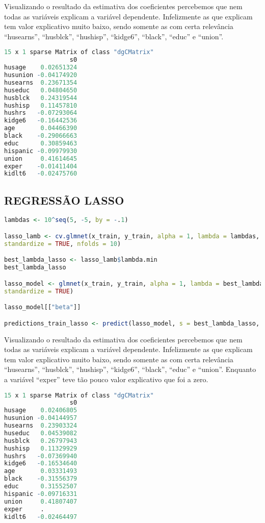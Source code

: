 Visualizando o resultado da estimativa dos coeficientes percebemos que nem todas as variáveis explicam a variável dependente. Infelizmente as que explicam tem valor explicativo muito baixo, sendo somente as com certa relevância ``husearns'', ``husblck'', ``hushisp'', ``kidge6'', ``black'', ``educ'' e ``union''. \\

\begin{lstlisting}[language=R, style=output]
15 x 1 sparse Matrix of class "dgCMatrix"
                  s0
husage    0.02651324
husunion -0.04174920
husearns  0.23671354
huseduc   0.04804650
husblck   0.24319544
hushisp   0.11457810
hushrs   -0.07293064
kidge6   -0.16442536
age       0.04466390
black    -0.29066663
educ      0.30859463
hispanic -0.09979930
union     0.41614645
exper    -0.01411404
kidlt6   -0.02475760
\end{lstlisting}



\subsection*{REGRESSÃO LASSO}
\begin{lstlisting}[language=R, style=input]
lambdas <- 10^seq(5, -5, by = -.1)

lasso_lamb <- cv.glmnet(x_train, y_train, alpha = 1, lambda = lambdas, 
standardize = TRUE, nfolds = 10)

best_lambda_lasso <- lasso_lamb$lambda.min 
best_lambda_lasso

lasso_model <- glmnet(x_train, y_train, alpha = 1, lambda = best_lambda_lasso, 
standardize = TRUE)

lasso_model[["beta"]]

predictions_train_lasso <- predict(lasso_model, s = best_lambda_lasso, newx = x_train)
\end{lstlisting}

Visualizando o resultado da estimativa dos coeficientes percebemos que nem todas as variáveis explicam a variável dependente. Infelizmente as que explicam tem valor explicativo muito baixo, sendo somente as com certa relevância ``husearns'', ``husblck'', ``hushisp'', ``kidge6'', ``black'', ``educ'' e ``union''. Enquanto a variável ``exper'' teve tão pouco valor explicativo que foi a zero. \\

\begin{lstlisting}[language=R, style=output]
15 x 1 sparse Matrix of class "dgCMatrix"
                  s0
husage    0.02406805
husunion -0.04144957
husearns  0.23903324
huseduc   0.04539082
husblck   0.26797943
hushisp   0.11329929
hushrs   -0.07369940
kidge6   -0.16534640
age       0.03331493
black    -0.31556379
educ      0.31552507
hispanic -0.09716331
union     0.41807407
exper     .         
kidlt6   -0.02464497
\end{lstlisting}

